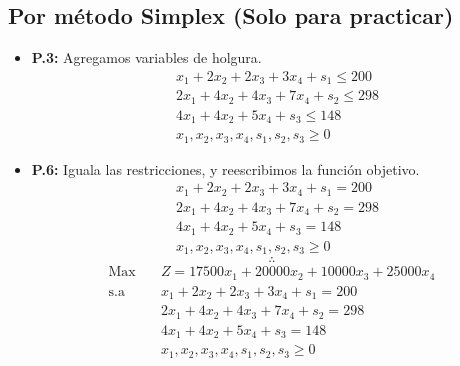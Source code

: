 \documentclass{templateNote}
\begin{document}
\subsection*{Por método Simplex (Solo para practicar)}
\begin{itemize}
    \item \textbf{P.3:} Agregamos variables de holgura.
    \begin{equation*}
        \begin{aligned}
            & x_1 + 2x_2 + 2x_3 + 3x_4 + s_1 \leq 200 \\
            & 2x_1 + 4x_2 + 4x_3 + 7x_4 + s_2 \leq 298 \\
            & 4x_1 + 4x_2 + 5x_4 + s_3 \leq 148 \\
            & x_1, x_2, x_3, x_4, s_1, s_2, s_3 \geq 0
        \end{aligned}
    \end{equation*}

    \item \textbf{P.6:} Iguala las restricciones, y reescribimos la función objetivo.
    \begin{equation*}
        \begin{aligned}
            & x_1 + 2x_2 + 2x_3 + 3x_4 + s_1 = 200 \\
            & 2x_1 + 4x_2 + 4x_3 + 7x_4 + s_2 = 298 \\
            & 4x_1 + 4x_2 + 5x_4 + s_3 = 148 \\
            & x_1, x_2, x_3, x_4, s_1, s_2, s_3 \geq 0
        \end{aligned}
    \end{equation*}
    \begin{equation*}
        \therefore
    \end{equation*}
    \begin{equation*}
        \begin{aligned}
            \text{Max} \quad & Z = 17500x_1 + 20000x_2 + 10000x_3 + 25000x_4 \\
            \text{s.a} \quad & x_1 + 2x_2 + 2x_3 + 3x_4 + s_1 = 200 \\
            & 2x_1 + 4x_2 + 4x_3 + 7x_4 + s_2 = 298 \\
            & 4x_1 + 4x_2 + 5x_4 + s_3 = 148 \\
            & x_1, x_2, x_3, x_4, s_1, s_2, s_3 \geq 0
        \end{aligned}
    \end{equation*}


\end{itemize}
\end{document}
